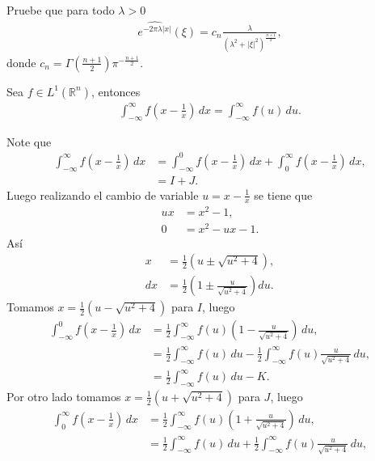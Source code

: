\begin{homeworkProblem}
  Pruebe que para todo $\lambda>0$
  \begin{align*}
    \hat{e^{-2\pi\lambda|x|}}(\xi)=c_{n}\frac{\lambda}{(\lambda^2+|\xi|^2)^{\frac{n+1}{2}}},
  \end{align*}
  donde $c_n=\Gamma\left( \frac{n+1}{2} \right)\pi^{-\frac{n+1}{2}}$.
  \begin{lemma}{}
    Sea $f\in L^1(\mathbb{R}^{n})$, entonces
    \begin{align*}
      \int_{-\infty}^{\infty}f\left( x-\frac{1}{x} \right)\, dx=\int_{-\infty}^{\infty}f(u)\, du.
    \end{align*}
  \end{lemma}
  Note que
  \begin{align*}
    \int_{-\infty}^{\infty}f\left( x-\frac{1}{x} \right)\, dx&=\int_{-\infty}^{0}f\left( x-\frac{1}{x} \right)\, dx+\int_{0}^{\infty}f\left( x-\frac{1}{x} \right)\, dx,\\
    &= I + J.
  \end{align*}
  Luego realizando el cambio de variable $u=x-\frac{1}{x}$ se tiene que
  \begin{align*}
    ux&=x^2-1,\\
    0&=x^2-ux-1.
  \end{align*}
  Así
  \begin{align*}
    x&=\frac{1}{2}\left( u\pm \sqrt{u^2+4} \right),\\
    dx&=\frac{1}{2}\left( 1\pm \frac{u}{\sqrt{u^2+4}} \right)du.
  \end{align*}
  Tomamos $x=\frac{1}{2}\left( u-\sqrt{u^2+4} \right)$ para $I$, luego
  \begin{align*}
    \int_{-\infty}^{0}f\left( x-\frac{1}{x} \right)\, dx&=\frac{1}{2}\int_{-\infty}^{\infty}f(u)\left( 1-\frac{u}{\sqrt{u^2+4}}\right)\, du,\\
    &=\frac{1}{2}\int_{-\infty}^{\infty}f(u)\, du - \frac{1}{2}\int_{-\infty}^{\infty}f(u)\frac{u}{\sqrt{u^2+4}}\, du,\\
    &=\frac{1}{2}\int_{-\infty}^{\infty}f(u)\, du - K.
  \end{align*}
  Por otro lado tomamos $x=\frac{1}{2}\left( u+\sqrt{u^2+4} \right)$ para $J$, luego
  \begin{align*}
    \int_{0}^{\infty}f\left( x-\frac{1}{x} \right)\, dx&=\frac{1}{2}\int_{-\infty}^{\infty}f(u)\left( 1+\frac{u}{\sqrt{u^2+4}}\right)\, du,\\
    &=\frac{1}{2}\int_{-\infty}^{\infty}f(u)\, du + \frac{1}{2}\int_{-\infty}^{\infty}f(u)\frac{u}{\sqrt{u^2+4}}\, du,\\

\end{align*}
\end{homeworkProblem}
